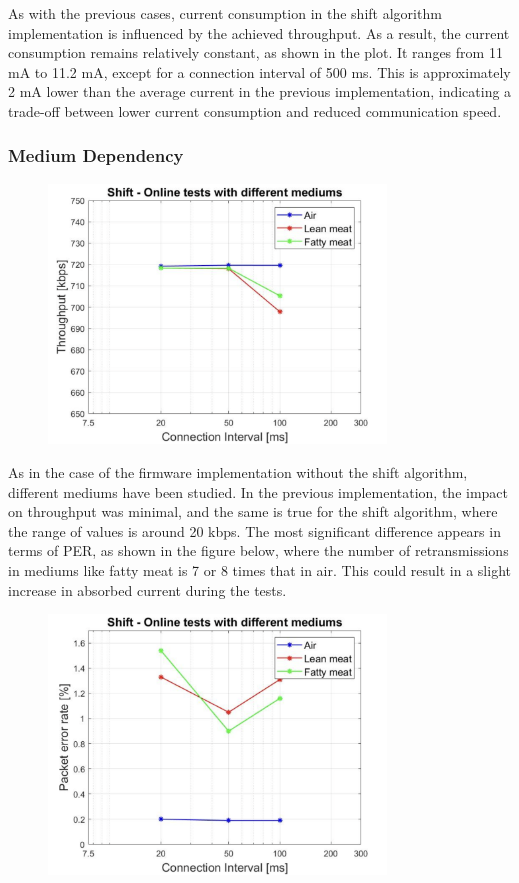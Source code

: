 \documentclass{Configuration_Files/PoliMi3i_thesis}
\begin{document}
As with the previous cases, current consumption in the shift algorithm implementation is influenced by the achieved throughput. As a result, the current consumption remains relatively constant, as shown in the plot. It ranges from 11 mA to 11.2 mA, except for a connection interval of 500 ms. This is approximately 2 mA lower than the average current in the previous implementation, indicating a trade-off between lower current consumption and reduced communication speed.

\subsubsection*{Medium Dependency}

\begin{figure}[H]
    \centering
    \includegraphics[width=0.8\textwidth]{Results Manuel/figure20}
    \label{fig:figure1}
\end{figure}

As in the case of the firmware implementation without the shift algorithm, different mediums have been studied. In the previous implementation, the impact on throughput was minimal, and the same is true for the shift algorithm, where the range of values is around 20 kbps. The most significant difference appears in terms of PER, as shown in the figure below, where the number of retransmissions in mediums like fatty meat is 7 or 8 times that in air. This could result in a slight increase in absorbed current during the tests.

\begin{figure}[H]
    \centering
    \includegraphics[width=0.8\textwidth]{Results Manuel/figure21}
    \label{fig:figure1}
\end{figure}
\end{document}
